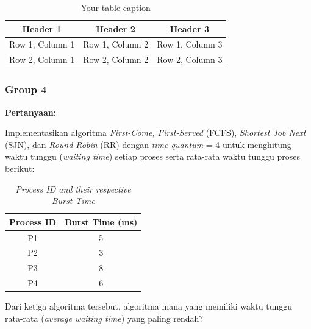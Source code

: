 \documentclass[12pt]{article}
\begin{document}
\begin{table}[htbp] %
    \centering
    \begin{tabular}{|c|c|c|} %
    \hline
    Header 1 & Header 2 & Header 3 \\ %
    \hline
    Row 1, Column 1 & Row 1, Column 2 & Row 1, Column 3 \\ %
    \hline
    Row 2, Column 1 & Row 2, Column 2 & Row 2, Column 3 \\ %
    \hline
    \end{tabular}
    \caption{Your table caption} %
    \label{tab:your_label} %
\end{table}

\subsubsection{Group 4}
\textbf{Pertanyaan: }

Implementasikan algoritma \textit{First-Come, First-Served} (FCFS), \textit{Shortest Job Next} (SJN), dan \textit{Round Robin} (RR) dengan \textit{time quantum} = 4 untuk menghitung waktu tunggu (\textit{waiting time}) setiap proses serta rata-rata waktu tunggu proses berikut:
\begin{table}[htbp] %
    \centering
    \begin{tabular}{|c|c|} %
    \hline
    \textbf{Process ID} & \textbf{Burst Time (ms)} \\ 
    \hline
    P1 & 5 \\ 
    \hline
    P2 & 3 \\
    \hline
    P3 & 8 \\
    \hline
    P4 & 6 \\ 
    \hline
    \end{tabular}
    \caption{\textit{Process ID and their respective Burst Time}}
    \label{tab:process_burst_time} 
\end{table}

\noindent Dari ketiga algoritma tersebut, algoritma mana yang memiliki waktu tunggu rata-rata (\textit{average waiting time}) yang paling rendah?\\
\end{document}
